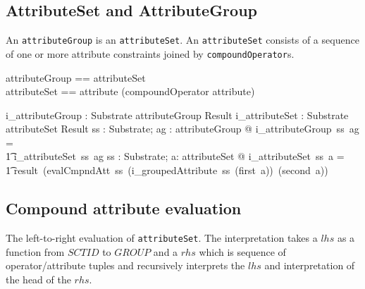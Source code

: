 \documentclass{article}
\def\spec#1{{\tt #1}}
\begin{document}
\subsection{AttributeSet and AttributeGroup}
An \spec{attributeGroup} is an \spec{attributeSet}.  An \spec{attributeSet} consists of a sequence of one or more attribute constraints joined by \spec{compoundOperator}s.



\begin{zed}
attributeGroup == attributeSet \\
attributeSet == attribute \cross \seq (compoundOperator \cross attribute) 
\end{zed}

\begin{gendef}
   i\_attributeGroup : Substrate \pfun attributeGroup \pfun Result 
\also
   i\_attributeSet : Substrate \pfun attributeSet \pfun Result 
\where
\forall ss : Substrate; ag : attributeGroup @ i\_attributeGroup~ss~ag = \\
\t1 i\_attributeSet~ss~ag
\also
\forall ss : Substrate; a: attributeSet @ i\_attributeSet~ss~a = \\
\t1 result~(evalCmpndAtt~ss~(i\_groupedAttribute~ss~(first~a))~(second~a))
\end{gendef}

\subsection{Compound attribute evaluation}
The left-to-right evaluation of \spec{attributeSet}.  The interpretation takes a $lhs$ as 
a function from $SCTID$ to $GROUP$ and a $rhs$ which is sequence of operator/attribute
tuples and recursively interprets the $lhs$ and interpretation of the head of the $rhs$.
\end{document}
